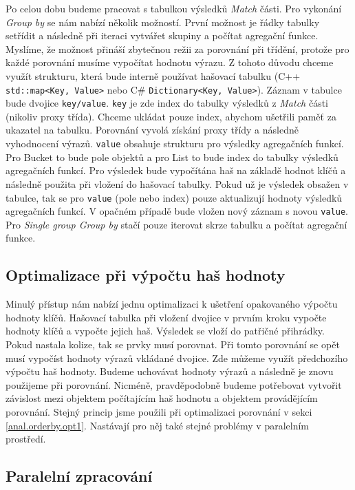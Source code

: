Po celou dobu budeme pracovat s tabulkou výsledků \textit{Match} části.
Pro vykonání \textit{Group by} se nám nabízí několik možností.
První možnost je řádky tabulky setřídit a následně při iteraci vytvářet skupiny a počítat agregační funkce.
Myslíme, že možnost přináší zbytečnou režii za porovnání při třídění, protože pro každé porovnání musíme vypočítat hodnotu výrazu.
Z tohoto důvodu chceme využít strukturu, která bude interně používat hašovací tabulku (C++ \texttt{std::map<Key, Value>} nebo C\#  \texttt{Dictionary<Key, Value>}).
Záznam v tabulce bude dvojice \texttt{key/value}. 
\texttt{key} je zde index do tabulky výsledků z \textit{Match} části (nikoliv proxy třída).
Chceme ukládat pouze index, abychom ušetřili paměť za ukazatel na tabulku.
Porovnání vyvolá získání proxy třídy a následně vyhodnocení výrazů.
\texttt{value} obsahuje strukturu pro výsledky agregačních funkcí.
Pro Bucket to bude pole objektů a pro List to bude index do tabulky výsledků agregačních funkcí.
Pro výsledek bude vypočítána haš na základě hodnot klíčů a následně použita při vložení do hašovací tabulky.
Pokud už je výsledek obsažen v tabulce, tak se pro \texttt{value} (pole nebo index) pouze aktualizují hodnoty výsledků agregačních funkcí.
V opačném případě bude vložen nový záznam s novou \texttt{value}.
Pro \textit{Single group Group by} stačí pouze iterovat skrze tabulku a počítat agregační funkce.

\subsection{Optimalizace při výpočtu haš hodnoty} \label{anal.groupby.opt1}

Minulý přístup nám nabízí jednu optimalizaci k ušetření opakovaného výpočtu hodnoty klíčů.
Hašovací tabulka při vložení dvojice v prvním kroku vypočte hodnoty klíčů a vypočte jejich haš.
Výsledek se vloží do patřičné přihrádky.
Pokud nastala kolize, tak se prvky musí porovnat.
Při tomto porovnání se opět musí vypočíst hodnoty výrazů vkládané dvojice.
Zde můžeme využít předchozího výpočtu haš hodnoty.
Budeme uchovávat hodnoty výrazů a následně je znovu použijeme při porovnání.
Nicméně, pravděpodobně budeme potřebovat vytvořit závislost mezi objektem počítajícím haš hodnotu a objektem provádějícím porovnání.
Stejný princip jsme použili při optimalizaci porovnání v sekci \ref{anal.orderby.opt1}.
Nastávají pro něj také stejné problémy v paralelním prostředí.

\subsection{Paralelní zpracování} \label{anal.groupby.paralel}

